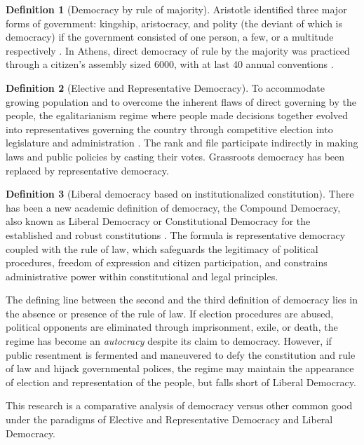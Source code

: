\documentclass{scrartcl}
\theoremstyle{definition}
\newtheorem{definition}{Definition}
\begin{document}
\begin{definition}[Democracy by rule of majority]
Aristotle identified
three major forms of government: kingship, aristocracy, and polity
(the deviant of which is democracy) if the government consisted of
one person, a few, or a multitude respectively \autocite{arispol}.
In Athens, direct democracy of rule by the majority was practiced
through a citizen's assembly sized 6000, with at last 40 annual conventions \autocite{Bao2018}. 
\end{definition}

\begin{definition}[Elective and Representative Democracy]
To accommodate growing population and to overcome the inherent flaws
of direct governing by the people, the egalitarianism regime where
people made decisions together evolved into representatives governing
the country through competitive election into legislature and administration
\autocite{capsocdem}. The rank and file participate indirectly in
making laws and public policies by casting their votes. Grassroots
democracy has been replaced by representative democracy. 
\end{definition}

\begin{definition}[Liberal democracy based on institutionalized constitution]
There has been a new academic definition of democracy, the Compound
Democracy, also known as Liberal Democracy or Constitutional Democracy
for the established and robust constitutions \autocite{Bao2018}. The
formula is representative democracy coupled with the rule of law,
which safeguards the legitimacy of political procedures, freedom of
expression and citizen participation, and constrains administrative
power within constitutional and legal principles. 
\end{definition}


The defining line between the second and the third definition of democracy
lies in the absence or presence of the rule of law. If election procedures
are abused, political opponents are eliminated through imprisonment,
exile, or death, the regime has become an \emph{autocracy} despite its claim
to democracy. However, if public resentment is fermented and maneuvered
to defy the constitution and rule of law and hijack governmental polices,
the regime may maintain the appearance of election and representation
of the people, but falls short of Liberal Democracy. 

This research is a comparative analysis of democracy versus other
common good under the paradigms of Elective and Representative Democracy
and Liberal Democracy. 
\end{document}
